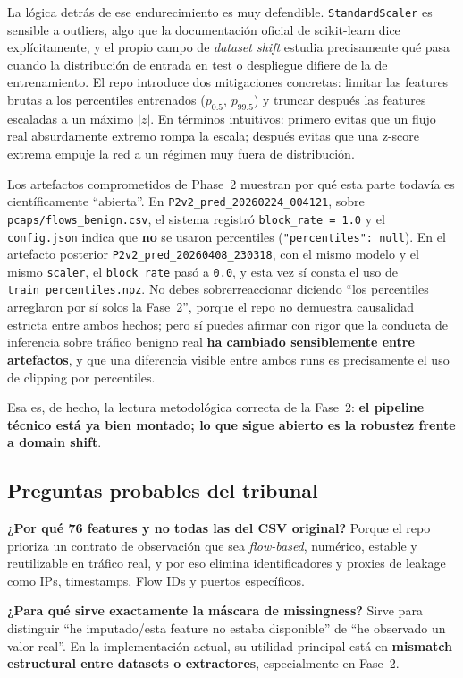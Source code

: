 ﻿\documentclass[12pt,a4paper]{article}
\begin{document}
La lógica detrás de ese endurecimiento es muy defendible. \texttt{StandardScaler} es sensible a
outliers, algo que la documentación oficial de scikit-learn dice explícitamente, y el propio campo
de \textit{dataset shift} estudia precisamente qué pasa cuando la distribución de entrada en test o
despliegue difiere de la de entrenamiento. El repo introduce dos mitigaciones concretas: limitar las
features brutas a los percentiles entrenados (\(p_{0.5}\), \(p_{99.5}\)) y truncar después las
features escaladas a un máximo \(|z|\). En términos intuitivos: primero evitas que un flujo real
absurdamente extremo rompa la escala; después evitas que una z-score extrema empuje la red a un
régimen muy fuera de distribución.

Los artefactos comprometidos de Phase~2 muestran por qué esta parte todavía es científicamente
``abierta''. En \texttt{P2v2\_pred\_20260224\_004121}, sobre \verb|pcaps/flows_benign.csv|, el
sistema registró \texttt{block\_rate~=~1.0} y el \texttt{config.json} indica que \textbf{no} se
usaron percentiles (\texttt{"percentiles":~null}). En el artefacto posterior
\texttt{P2v2\_pred\_20260408\_230318}, con el mismo modelo y el mismo \texttt{scaler}, el
\texttt{block\_rate} pasó a \texttt{0.0}, y esta vez sí consta el uso de
\texttt{train\_percentiles.npz}. No debes sobrerreaccionar diciendo ``los percentiles arreglaron por
sí solos la Fase~2'', porque el repo no demuestra causalidad estricta entre ambos hechos; pero sí
puedes afirmar con rigor que la conducta de inferencia sobre tráfico benigno real \textbf{ha
cambiado sensiblemente entre artefactos}, y que una diferencia visible entre ambos runs es
precisamente el uso de clipping por percentiles.

Esa es, de hecho, la lectura metodológica correcta de la Fase~2: \textbf{el pipeline técnico está
ya bien montado; lo que sigue abierto es la robustez frente a domain shift}.

\subsection{Preguntas probables del tribunal}

\textbf{¿Por qué 76 features y no todas las del CSV original?}
Porque el repo prioriza un contrato de observación que sea \textit{flow-based}, numérico, estable y
reutilizable en tráfico real, y por eso elimina identificadores y proxies de leakage como IPs,
timestamps, Flow IDs y puertos específicos.

\textbf{¿Para qué sirve exactamente la máscara de missingness?}
Sirve para distinguir ``he imputado/esta feature no estaba disponible'' de ``he observado un valor
real''. En la implementación actual, su utilidad principal está en \textbf{mismatch estructural entre
datasets o extractores}, especialmente en Fase~2.
\end{document}
